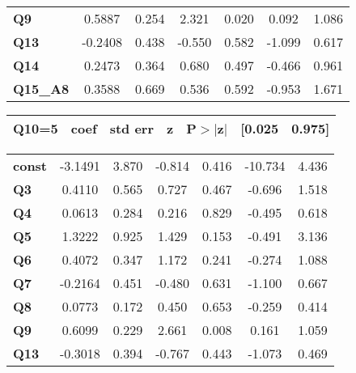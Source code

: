 \begin{center}
\begin{tabular}{lcccccc}
\textbf{Q9}      &       0.5887  &        0.254     &     2.321  &         0.020        &        0.092    &        1.086     \\
\textbf{Q13}     &      -0.2408  &        0.438     &    -0.550  &         0.582        &       -1.099    &        0.617     \\
\textbf{Q14}     &       0.2473  &        0.364     &     0.680  &         0.497        &       -0.466    &        0.961     \\
\textbf{Q15\_A8} &       0.3588  &        0.669     &     0.536  &         0.592        &       -0.953    &        1.671     \\
\bottomrule
\end{tabular}
\begin{tabular}{ccccccc}
 \textbf{Q10=5}  & \textbf{coef} & \textbf{std err} & \textbf{z} & \textbf{P$> |$z$|$} & \textbf{[0.025} & \textbf{0.975]}  \\
\midrule
\bottomrule
\end{tabular}
\begin{tabular}{lcccccc}
\textbf{const}   &      -3.1491  &        3.870     &    -0.814  &         0.416        &      -10.734    &        4.436     \\
\textbf{Q3}      &       0.4110  &        0.565     &     0.727  &         0.467        &       -0.696    &        1.518     \\
\textbf{Q4}      &       0.0613  &        0.284     &     0.216  &         0.829        &       -0.495    &        0.618     \\
\textbf{Q5}      &       1.3222  &        0.925     &     1.429  &         0.153        &       -0.491    &        3.136     \\
\textbf{Q6}      &       0.4072  &        0.347     &     1.172  &         0.241        &       -0.274    &        1.088     \\
\textbf{Q7}      &      -0.2164  &        0.451     &    -0.480  &         0.631        &       -1.100    &        0.667     \\
\textbf{Q8}      &       0.0773  &        0.172     &     0.450  &         0.653        &       -0.259    &        0.414     \\
\textbf{Q9}      &       0.6099  &        0.229     &     2.661  &         0.008        &        0.161    &        1.059     \\
\textbf{Q13}     &      -0.3018  &        0.394     &    -0.767  &         0.443        &       -1.073    &        0.469     \\

\end{tabular}
\end{center}
